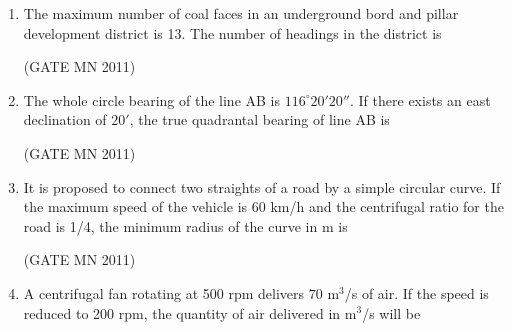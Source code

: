 \documentclass[journal]{IEEEtran}
\begin{document}
\begin{enumerate}
\item The maximum number of coal faces in an underground bord and pillar development district is 13. The number of headings in the district is

	\hfill(GATE MN 2011)
\begin{enumerate}
\end{enumerate}

\item The whole circle bearing of the line AB is $116^\circ 20'20''$. If there exists an east declination of $20'$, the true quadrantal bearing of line AB is

	\hfill(GATE MN 2011)
\begin{enumerate}
\end{enumerate}

\item It is proposed to connect two straights of a road by a simple circular curve. If the maximum speed of the vehicle is 60 km/h and the centrifugal ratio for the road is 1/4, the minimum radius of the curve in m is

	\hfill(GATE MN 2011)
\begin{enumerate}
\end{enumerate}

\item A centrifugal fan rotating at 500 rpm delivers $70$ m$^3$/s of air. If the speed is reduced to 200 rpm, the quantity of air delivered in m$^3$/s will be


\end{enumerate}
\end{document}
